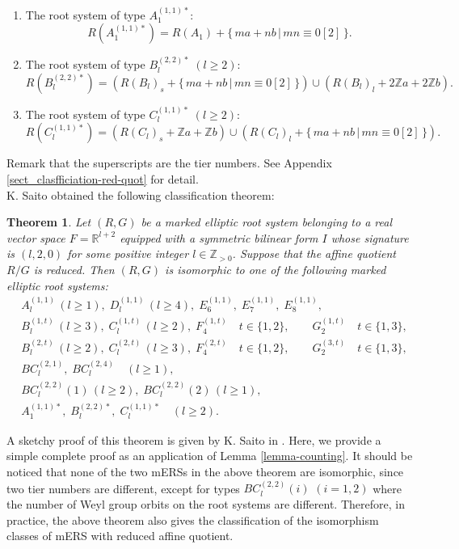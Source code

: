 \documentclass[11pt]{amsart}
\newcommand{\R}{\mathbb{R}}
\newcommand{\Z}{\mathbb{Z}}
\newtheorem{thm}{Theorem}[section]
\begin{document}
{\begin{enumerate}
\item The root system of type $A_1^{(1,1)\ast}$:
\[ R(A_1^{(1,1)\ast})=R(A_1)+\{\, ma+nb\, \vert\, mn \equiv 0 [2]\, \}. \]
\item The root system of type $B_l^{(2,2)\ast}\; (l\geq 2)$:
\[ R(B_l^{(2,2)\ast})=(R(B_l)_s+\{\, ma+nb\, \vert\, mn \equiv 0 [2]\, \}) \cup (R(B_l)_l+2\Z a+2\Z b). \]
\item The root system of type $C_l^{(1,1)\ast}\; (l\geq 2)$:
\[ R(C_l^{(1,1)\ast})=(R(C_l)_s+\Z a+\Z b) \cup (R(C_l)_l+\{\, ma+nb\, \vert\, mn \equiv 0 [2]\, \}). \]
\end{enumerate}
Remark that the superscripts are the tier numbers. See Appendix \ref{sect_clasfficiation-red-quot} for detail. \\

K. Saito \cite{Saito1985} obtained the following classification theorem:
\begin{thm}\label{thm:classification-red} Let $(R,G)$ be a marked elliptic root system belonging to a real vector space $F=\R^{l+2}$ equipped with a symmetric bilinear form $I$ whose signature is $(l,2,0)$ for some positive integer $l\in \Z_{>0}$. Suppose that the affine quotient $R/G$ is reduced. Then $(R,G)$ is isomorphic to one of the following marked elliptic root systems:
\begin{align*}
&A_l^{(1,1)}\,(l\geq 1),\;  D_l^{(1,1)}\, (l\geq 4),\;  E_6^{(1,1)}, \; E_7^{(1,1)}, \; E_8^{(1,1)}, \\
&B_l^{(1,t)}\, (l\geq 3),\; C_l^{(1,t)}\, (l\geq 2),\; F_4^{(1,t)} \quad t \in \{1,2\}, \qquad 
  G_2^{(1,t)} \quad t \in \{1,3\}, \\
&B_l^{(2,t)}\, (l\geq 2),\; C_l^{(2,t)}\, (l\geq 3), \; F_4^{(2,t)} \quad t \in \{1,2\}, \qquad
  G_2^{(3,t)}\quad t \in \{1,3\}, \\
&BC_l^{(2,1)}, \; BC_l^{(2,4)} \quad (l\geq 1), \\
&BC_l^{(2,2)}(1)\, (l\geq 2), \; BC_l^{(2,2)}(2)\, (l\geq 1), \\
&A_1^{(1,1)\ast}, \; B_l^{(2,2)\ast}, \; C_l^{(1,1)\ast}\quad (l\geq 2).
\end{align*}
\end{thm}
A sketchy proof of this theorem is given by K. Saito in  \cite{Saito1985}. Here, we provide a simple complete proof as an application of Lemma \ref{lemma-counting}.
It should be noticed that none of the two mERSs in the above theorem are isomorphic, since two tier numbers are different, except for types $BC_l^{(2,2)}(i)$ $(i=1,2)$ where the number of Weyl group orbits on the root systems are different.
Therefore, in practice, the above theorem also gives the classification of the isomorphism classes of mERS with reduced affine quotient. 
\medskip
}
\end{document}
